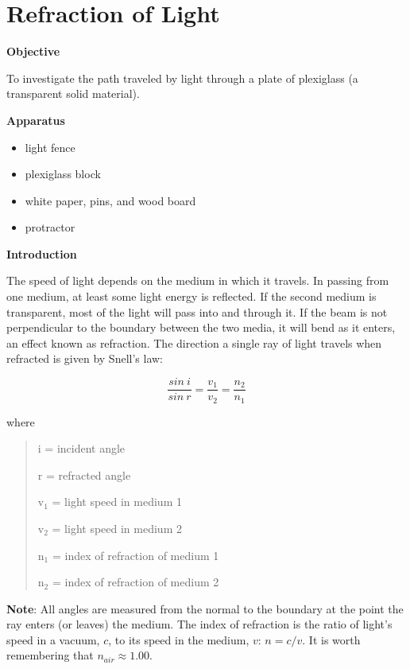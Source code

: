 
\section{Refraction of Light}

\makelabheader %

\bigskip
\textbf{Objective}

To investigate the path traveled by light through a plate of plexiglass
(a transparent solid material).

\bigskip
\textbf{Apparatus} 

\begin{itemize}
\item light fence 
\item plexiglass block 
\item white paper, pins, and wood board 
\item protractor
\end{itemize}

\textbf{Introduction}

The speed of light depends on the medium in which it travels. In passing
from one medium, at least some light energy is reflected. If the second
medium is transparent, most of the light will pass into and through
it. If the beam is not perpendicular to the boundary between the two
media, it will bend as it enters, an effect known as refraction. The
direction a single ray of light travels when refracted is given by
Snell's law:

\begin{displaymath} \frac{sin~i}{sin~r} = \frac{v_1}{v_2} = \frac{n_2}{n_1} \end{displaymath}

where

\begin{quote}
i = incident angle

r = refracted angle

v\( _{1} \) = light speed in medium 1

v\( _{2} \) = light speed in medium 2

n\( _{1} \) = index of refraction of medium 1 

n\( _{2} \) = index of refraction of medium 2
\end{quote}
\textbf{Note}: All angles are measured from the normal to the boundary
at the point the ray enters (or leaves) the medium. The index of refraction is
the ratio of light's speed in a vacuum, $c$, to its speed in the medium,
$v$: $n = c / v$. It is worth remembering that $n_{air} \approx 1.00$.

